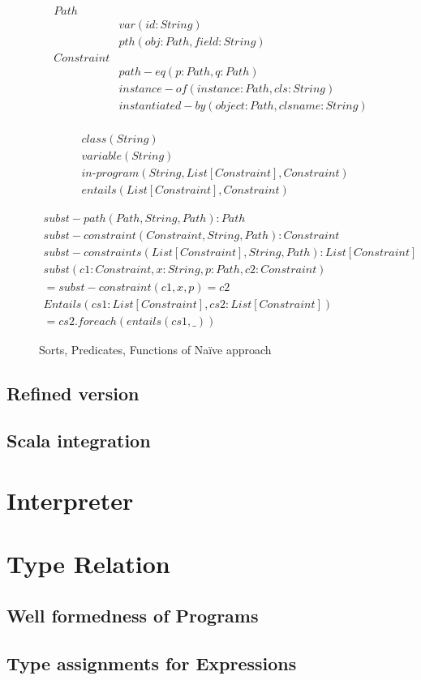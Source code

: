 \begin{figure}
\begin{align*}
\mathit{Path}\\
  &\mathit{var(id: String)}\\
  &\mathit{pth(obj: Path, field: String)}\\
\mathit{Constraint}\\
  &\mathit{path-eq(p: Path, q: Path)}\\
  &\mathit{instance-of(instance: Path, cls: String)}\\
  &\mathit{instantiated-by(object: Path, clsname: String)}\\
\end{align*}

\begin{align*}
&\mathit{class}(\mathit{String}) \\
&\mathit{variable}(\mathit{String})\\
&\mathit{in\text{-}program}(\mathit{String},\mathit{List[Constraint]}, \mathit{Constraint}) \\
&\mathit{entails}(\mathit{List[Constraint]}, \mathit{Constraint})
\end{align*}

\begin{align*}
\mathit{subst-path(Path, String, Path): Path} \\
\mathit{subst-constraint(Constraint, String, Path): Constraint} \\
\mathit{subst-constraints(List[Constraint], String, Path): List[Constraint]} \\
\mathit{subst(c1: Constraint, x: String, p: Path, c2: Constraint)} \\
= \mathit{subst-constraint(c1, x, p) = c2} \\
\mathit{Entails(cs1: List[Constraint], cs2: List[Constraint])} \\
= \mathit{cs2.foreach(entails(cs1, \_))}
\end{align*}
\caption{Sorts, Predicates, Functions of Na\"ive approach}
\label{fig:axioms-naive-sorts}
\end{figure}
\subsection{Refined version}
\subsection{Scala integration}

\section{Interpreter}
\section{Type Relation}
\subsection{Well formedness of Programs}
\subsection{Type assignments for Expressions}

